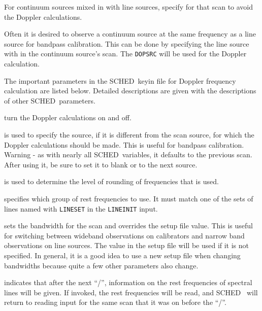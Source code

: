 \documentclass{report}
\newcommand{\sched}{{\sc SCHED}}
\newcommand{\schedb}{{\sc SCHED~}}
\begin{document}
For continuum sources mixed in with line sources, specify  for that scan to avoid the Doppler calculations.

Often it is desired to observe a continuum source at the same
frequency as a line source for bandpass calibration. This can be done
by specifying the line source with 
in the continuum source's scan. The {\tt DOPSRC} will be used for the
Doppler calculation.

The important parameters in the \schedb keyin file for Doppler
frequency calculation are listed below. Detailed descriptions are
given with the descriptions of other \schedb parameters.

\begin{list}{}{\parsep 0em  \itemsep 0em }
\item {} turn the
Doppler calculations on and off.

\item {} is used to specify the source,
if it is different from the scan source, for which the Doppler calculations
should be made.  This is useful for bandpass calibration.  Warning -
as with nearly all \sched\ variables, it defaults to the previous scan.
After using it, be sure to set it to blank or to the next source.

\item {} is used to determine the level
of rounding of frequencies that is used.

\item {} specifies which group of
rest frequencies to use. It must match one of the sets of lines
named with {\tt LINESET} in the {\tt LINEINIT} input.

\item {} sets the bandwidth for the scan and
overrides the setup file value.  This is useful for switching between
wideband observations on calibrators and narrow band observations on
line sources.  The value in the setup file will be used if it is
not specified.  In general, it is a good idea to use a new
setup file when changing bandwidths because quite a few other
parameters also change.


\item {} indicates that after the
next ``/'', information on the rest frequencies of spectral lines will
be given.  If invoked, the rest frequencies will be read, and \schedb
will return to reading input for the same scan that it was on before
the ``/''.

\end{list}
\end{document}
